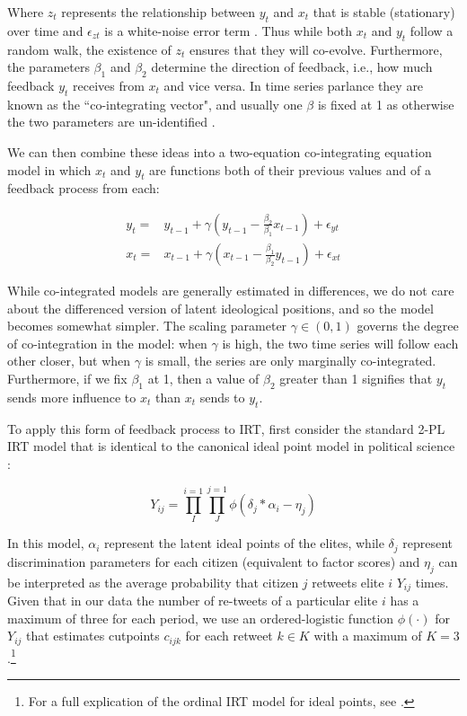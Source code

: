 \documentclass[12pt]{article}
\begin{document}
Where $z_t$ represents the relationship between $y_t$ and $x_t$ that is stable (stationary) over time and $\epsilon_{zt}$ is a white-noise error term \parencite[253]{engle1987}. Thus while both $x_t$ and $y_t$ follow a random walk, the existence of $z_t$ ensures that they will co-evolve. Furthermore, the parameters $\beta_1$ and $\beta_2$ determine the direction of feedback, i.e., how much feedback $y_t$ receives from $x_t$ and vice versa. In time series parlance they are known as the ``co-integrating vector", and usually one $\beta$ is fixed at 1 as otherwise the two parameters are un-identified \parencite[253]{timeseries2014}. 

We can then combine these ideas into a two-equation co-integrating equation model in which $x_t$ and $y_t$ are functions both of their previous values and of a feedback process from each:

\begin{align}
 y_t =& y_{t-1} + \gamma (y_{t-1} - \frac{\beta_2}{\beta_1}x_{t-1}) + \epsilon_{yt}\\
  x_t =& x_{t-1} + \gamma (x_{t-1} - \frac{\beta_1}{\beta_2}y_{t-1}) + \epsilon_{xt}
\end{align}

While co-integrated models are generally estimated in differences, we do not care about the differenced version of latent ideological positions, and so the model becomes somewhat simpler. The scaling parameter $\gamma \in (0,1)$ governs the degree of co-integration in the model: when $\gamma$ is high, the two time series will follow each other closer, but when $\gamma$ is small, the series are only marginally co-integrated. Furthermore, if we fix $\beta_1$ at 1, then a value of $\beta_2$ greater than 1 signifies that $y_t$ sends more influence to $x_t$ than $x_t$ sends to $y_t$. 

To apply this form of feedback process to IRT, first consider the standard 2-PL IRT model that is identical to the canonical ideal point model in political science \parencite{jackman2004}:

\begin{equation}
Y_{ij} = \prod^{i=1}_I \prod^{j=1}_J \phi(\delta_j * \alpha_i - \eta_j)
\end{equation}

In this model, $\alpha_i$ represent the latent ideal points of the elites, while $\delta_j$ represent discrimination parameters for each citizen (equivalent to factor scores) and $\eta_j$ can be interpreted as the average probability that citizen $j$ retweets elite $i$ $Y_{ij}$ times. Given that in our data the number of re-tweets of a particular elite $i$ has a maximum of three for each period, we use an ordered-logistic function $\phi(\cdot)$ for $Y_{ij}$ that estimates cutpoints $c_{ijk}$ for each retweet $k \in K$ with a maximum of $K=3$.\footnote{For a full explication of the ordinal IRT model for ideal points, see \textcite{kubinec2017}.}
\end{document}
